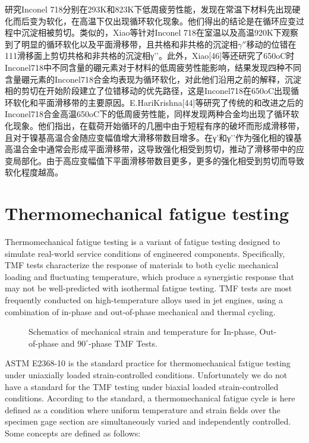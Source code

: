 \cite{Fournier1977}研究Inconel 718分别在293K和823K下低周疲劳性能，发现在常温下材料先出现硬化而后变为软化，在高温下仅出现循环软化现象。他们得出的结论是在循环应变过程中沉淀相被剪切。类似的，Xiao\cite{Xiao2005}等针对Inconel 718在室温以及高温920K下观察到了明显的循环软化以及平面滑移带，且共格和非共格的沉淀相$\gamma ''$移动的位错在{111}滑移面上剪切共格和非共格的沉淀相γ’’。此外，Xiao[46]等还研究了650oC时Inconel718中不同含量的硼元素对于材料的低周疲劳性能影响，结果发现四种不同含量硼元素的Inconel718合金均表现为循环软化，对此他们沿用之前的解释，沉淀相的剪切在开始阶段建立了位错移动的优先路径，这是Inconel718在650oC出现循环软化和平面滑移带的主要原因。E.HariKrishna[44]等研究了传统的和改进之后的Inconel718合金高温650oC下的低周疲劳性能，同样发现两种合金均出现了循环软化现象。他们指出，在载荷开始循环的几圈中由于短程有序的破坏而形成滑移带，且对于镍基高温合金随应变幅值增大滑移带数目增多。在γ’和γ’’作为强化相的镍基高温合金中通常会形成平面滑移带，这导致强化相受到剪切，推动了滑移带中的应变局部化。由于高应变幅值下平面滑移带数目更多，更多的强化相受到剪切而导致软化程度越高。

\section{Thermomechanical fatigue testing}
Thermomechanical fatigue testing is a variant of fatigue testing designed to simulate real-world service conditions of engineered components.
Specifically, TMF tests characterize the response of materials to both cyclic mechanical loading and fluctuating temperature, which produce a synergistic response that may not be well-predicted with isothermal fatigue testing.
TMF tests are most frequently conducted on high-temperature alloys used in jet engines, using a combination of in-phase and out-of-phase mechanical and thermal cycling.

\begin{figure}[!htp]
\centering{}
\caption{Schematics of mechanical strain and temperature for In-phase, Out-of-phase and $90^\circ$-phase TMF Tests.}
\label{Fig:Thermomechanical_phase}
\end{figure}

ASTM E2368-10 is the standard practice for thermomechanical fatigue testing under uniaxially loaded strain-controlled conditions.
Unfortunately we do not have a standard for the TMF testing under biaxial loaded strain-controlled conditions.
According to the standard, a thermomechanical fatigue cycle is here defined as a condition where uniform temperature and strain fields over the specimen gage section are simultaneously varied and independently controlled.
Some concepts are defined as follows:

